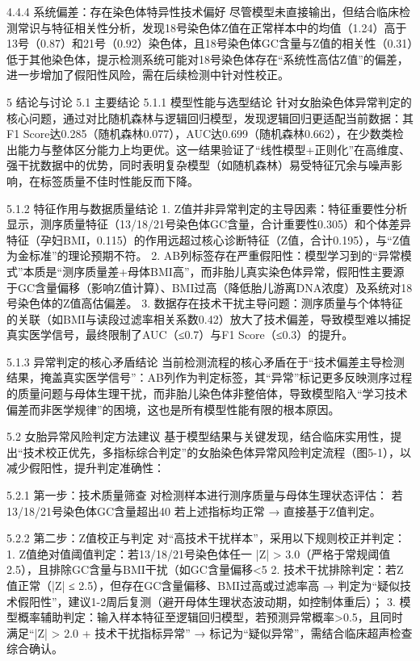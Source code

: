 \documentclass[withoutpreface,bwprint]{cumcmthesis} %
\begin{document}
4.4.4 系统偏差：存在染色体特异性技术偏好
尽管模型未直接输出，但结合临床检测常识与特征相关性分析，发现18号染色体Z值在正常样本中的均值（1.24）高于13号（0.87）和21号（0.92）染色体，且18号染色体GC含量与Z值的相关性（0.31）低于其他染色体，提示检测系统可能对18号染色体存在“系统性高估Z值”的偏差，进一步增加了假阳性风险，需在后续检测中针对性校正。


5 结论与讨论
5.1 主要结论
5.1.1 模型性能与选型结论
针对女胎染色体异常判定的核心问题，通过对比随机森林与逻辑回归模型，发现逻辑回归更适配当前数据：其F1 Score达0.285（随机森林0.077），AUC达0.699（随机森林0.662），在少数类检出能力与整体区分能力上均更优。这一结果验证了“线性模型+正则化”在高维度、强干扰数据中的优势，同时表明复杂模型（如随机森林）易受特征冗余与噪声影响，在标签质量不佳时性能反而下降。

5.1.2 特征作用与数据质量结论
1. Z值并非异常判定的主导因素：特征重要性分析显示，测序质量特征（13/18/21号染色体GC含量，合计重要性0.305）和个体差异特征（孕妇BMI，0.115）的作用远超过核心诊断特征（Z值，合计0.195），与“Z值为金标准”的理论预期不符。  
2. AB列标签存在严重假阳性：模型学习到的“异常模式”本质是“测序质量差+母体BMI高”，而非胎儿真实染色体异常，假阳性主要源于GC含量偏移（影响Z值计算）、BMI过高（降低胎儿游离DNA浓度）及系统对18号染色体的Z值高估偏差。  
3. 数据存在技术干扰主导问题：测序质量与个体特征的关联（如BMI与读段过滤率相关系数0.42）放大了技术偏差，导致模型难以捕捉真实医学信号，最终限制了AUC（≤0.7）与F1 Score（≤0.3）的提升。

5.1.3 异常判定的核心矛盾结论
当前检测流程的核心矛盾在于“技术偏差主导检测结果，掩盖真实医学信号”：AB列作为判定标签，其“异常”标记更多反映测序过程的质量问题与母体生理干扰，而非胎儿染色体非整倍体，导致模型陷入“学习技术偏差而非医学规律”的困境，这也是所有模型性能有限的根本原因。


5.2 女胎异常风险判定方法建议
基于模型结果与关键发现，结合临床实用性，提出“技术校正优先，多指标综合判定”的女胎染色体异常风险判定流程（图5-1），以减少假阳性，提升判定准确性：

5.2.1 第一步：技术质量筛查
对检测样本进行测序质量与母体生理状态评估：  
若13/18/21号染色体GC含量超出40%
若上述指标均正常 → 直接基于Z值判定。

5.2.2 第二步：Z值校正与判定
对“高技术干扰样本”，采用以下规则校正并判定：  
1. Z值绝对值阈值判定：若13/18/21号染色体任一 |Z| > 3.0（严格于常规阈值2.5），且排除GC含量与BMI干扰（如GC含量偏移<5%
2. 技术干扰排除判定：若Z值正常（|Z| ≤ 2.5），但存在GC含量偏移、BMI过高或过滤率高 → 判定为“疑似技术假阳性”，建议1-2周后复测（避开母体生理状态波动期，如控制体重后）；  
3. 模型概率辅助判定：输入样本特征至逻辑回归模型，若预测异常概率>0.5，且同时满足“|Z| > 2.0 + 技术干扰指标异常” → 标记为“疑似异常”，需结合临床超声检查综合确认。
\end{document}
